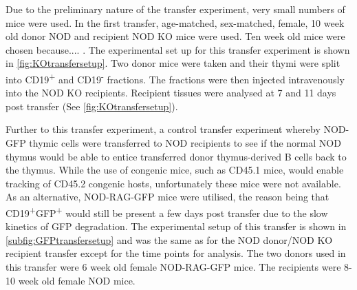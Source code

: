 Due to the preliminary nature of the transfer experiment, very small numbers of mice were used.
In the first transfer, age-matched, sex-matched, female, 10 week old donor NOD and recipient NOD KO mice were used.
Ten week old mice were chosen because.... .
The experimental set up for this transfer experiment is shown in \cref{fig:KOtransfersetup}.
Two donor mice were taken and their thymi were split into CD19\textsuperscript{+} and CD19\textsuperscript{-} fractions.
The fractions were then injected intravenously into the NOD KO recipients.
Recipient tissues were analysed at 7 and 11 days post transfer (See \cref{fig:KOtransfersetup}).

Further to this transfer experiment, a control transfer experiment whereby NOD-GFP thymic cells were transferred to NOD recipients to see if the normal NOD thymus would be able to entice transferred donor thymus-derived B cells back to the thymus.
While the use of congenic mice, such as CD45.1 mice, would enable tracking of CD45.2 congenic hosts, unfortunately these mice were not available.
As an alternative, NOD-RAG-GFP mice were utilised, the reason being that CD19\textsuperscript{+}GFP\textsuperscript{+} would still be present a few days post transfer due to the slow kinetics of GFP degradation.
The experimental setup of this transfer is shown in \cref{subfig:GFPtransfersetup} and was the same as for the NOD donor/NOD KO recipient transfer except for the time points for analysis.
The two donors used in this transfer were 6 week old female NOD-RAG-GFP mice. 
The recipients were 8-10 week old female NOD mice.

